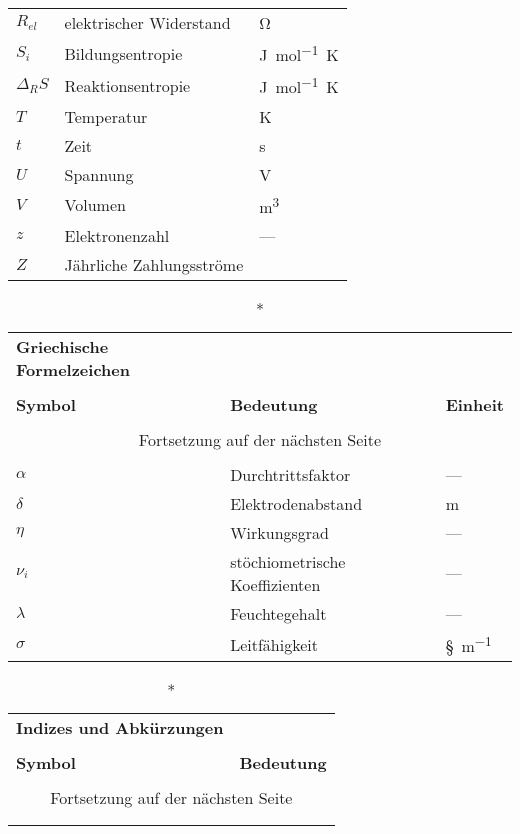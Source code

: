 \begin{onehalfspacing}
\begin{longtable}[h]{p{} p{} p{}}
		$R_{el}$ 	& elektrischer Widerstand									& \si{\ohm}\\
		$S_i$		& Bildungsentropie											& \si{\joule\per\mol\kelvin}\\
		$\Delta_R S$	& Reaktionsentropie 									& \si{\joule\per\mol\kelvin}\\
		$T$ 		& Temperatur 												& \si{\kelvin}\\
		$t$ 		& Zeit 														& \si{\second}\\
		$U$ 		& Spannung 													& \si{\V}\\
		$V$ 		& Volumen 													& \si{\meter^{3}}\\
		$z$ 		& Elektronenzahl		 									& --- \\
		$Z$			& Jährliche Zahlungsströme									& \si{\sieuro}\\
		
\end{longtable}

\begin{longtable}[h]{p{} p{} p{}}
		\caption*{\textbf{Griechische Formelzeichen}} \\
		\\
		\textbf{Symbol} & \textbf{Bedeutung} & \textbf{Einheit} \\ %
		\endhead
		\\
		\multicolumn{3}{c}{Fortsetzung auf der nächsten Seite} \\
		\endfoot
		\multicolumn{3}{c}{ } \\
		\endlastfoot
		
		$\alpha$	& Durchtrittsfaktor											& ---\\		
		$\delta$	& Elektrodenabstand											& \si{\m}\\
		$\eta$		& Wirkungsgrad												& ---\\
		$\nu_i$ 	& stöchiometrische Koeffizienten							& ---\\
		$\lambda$	& Feuchtegehalt												& ---\\
		$\sigma$	& Leitfähigkeit												& \si{\S\per\m}\\


\end{longtable}

\begin{longtable}[h]{p{} p{}}
		\caption*{\textbf{Indizes und Abkürzungen}} \\
		\\
		\textbf{Symbol} & \textbf{Bedeutung} \\ %
		\endhead
		\\
		\multicolumn{2}{c}{Fortsetzung auf der nächsten Seite} \\
		\endfoot
		\multicolumn{2}{c}{ } \\
		\endlastfoot
		

\end{longtable}
\end{onehalfspacing}
